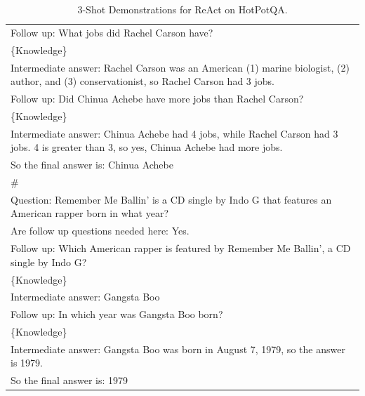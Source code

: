 \begin{table}[t!]
{\begin{tabular}{p{\textwidth}}
Follow up: What jobs did Rachel Carson have?\\
\{Knowledge\}\\
Intermediate answer: Rachel Carson was an American (1) marine biologist, (2) author, and (3) conservationist, so Rachel Carson had 3 jobs.\\
Follow up: Did Chinua Achebe have more jobs than Rachel Carson?\\
\{Knowledge\}\\
Intermediate answer: Chinua Achebe had 4 jobs, while Rachel Carson had 3 jobs. 4 is greater than 3, so yes, Chinua Achebe had more jobs.\\
So the final answer is: Chinua Achebe\\
\#\\
Question: Remember Me Ballin' is a CD single by Indo G that features an American rapper born in what year?\\
Are follow up questions needed here: Yes.\\
Follow up: Which American rapper is featured by Remember Me Ballin', a CD single by Indo G?\\
\{Knowledge\}\\
Intermediate answer: Gangsta Boo\\
Follow up: In which year was Gangsta Boo born?\\
\{Knowledge\}\\
Intermediate answer: Gangsta Boo was born in August 7, 1979, so the answer is 1979.\\
So the final answer is: 1979\\
\bottomrule
\end{tabular}
}
\caption{3-Shot Demonstrations for ReAct on HotPotQA.}\label{tab:HotPotQA-react}
\end{table}
\endgroup


